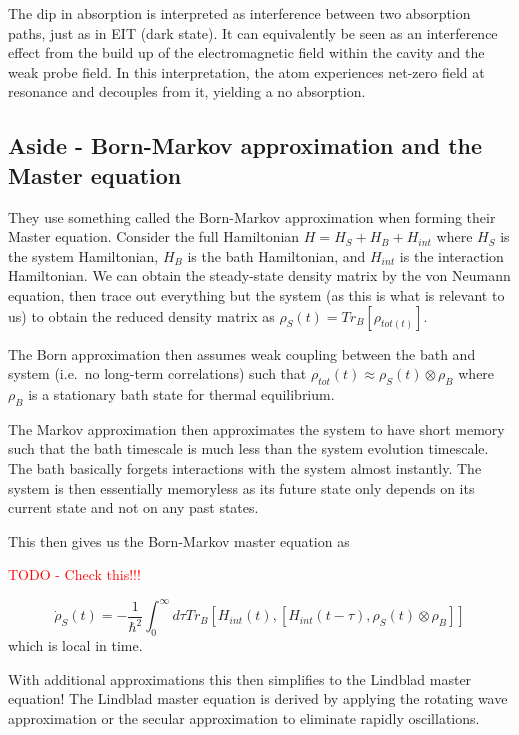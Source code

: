 \documentclass[aps,pra,twocolumn,showpacs,amsmath,amssymb,nofootinbib,longbibliography,superscriptaddress
]{revtex4-1}
\theoremstyle{definition}
\theoremstyle{remark}
\newcommand{\0}{\hat{0}}
\begin{document}
The dip in absorption is interpreted as interference between two absorption paths, just as in EIT (dark state). It can equivalently be seen as an interference effect from the build up of the electromagnetic field within the cavity and the weak probe field. In this interpretation, the atom experiences net-zero field at resonance and decouples from it, yielding a no absorption.



\subsection{Aside - Born-Markov approximation and the Master equation}

They use something called the Born-Markov approximation when forming their Master equation. Consider the full Hamiltonian $H = H_S + H_B + H_{int}$ where $H_S$ is the system Hamiltonian, $H_B$ is the bath Hamiltonian, and $H_{int}$ is the interaction Hamiltonian. We can obtain the steady-state density matrix by the von Neumann equation, then trace out everything but the system (as this is what is relevant to us) to obtain the reduced density matrix as $\rho_S(t) = Tr_B[\rho_{tot(t)}]$.

The Born approximation then assumes weak coupling between the bath and system (i.e.~no long-term correlations) such that $\rho_{tot}(t) \approx \rho_S(t) \otimes \rho_B$ where $\rho_B$ is a stationary bath state for thermal equilibrium.

The Markov approximation then approximates the system to have short memory such that the bath timescale is much less than the system evolution timescale. The bath basically forgets interactions with the system almost instantly. The system is then essentially memoryless as its future state only depends on its current state and not on any past states.

This then gives us the Born-Markov master equation as

\textcolor{red}{TODO - Check this!!!}

\begin{equation}
    \dot{\rho}_S(t) = - \frac{1}{\hbar^2} \int_0^{\infty} d\tau Tr_B[H_{int}(t), [H_{int}(t-\tau), \rho_S(t) \otimes \rho_B]]
\end{equation}
which is local in time.

With additional approximations this then simplifies to the Lindblad master equation! The Lindblad master equation is derived by applying the rotating wave approximation or the secular approximation to eliminate rapidly oscillations. 
\end{document}
